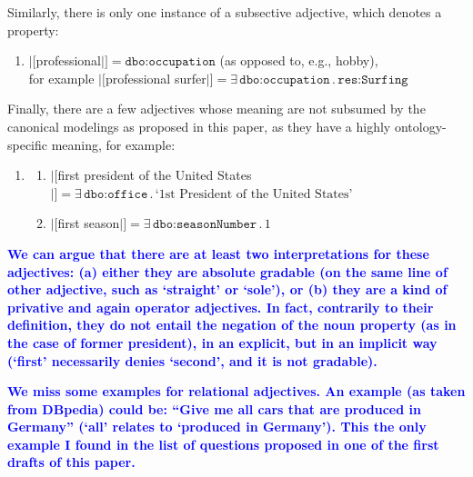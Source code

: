 \documentclass[11pt]{article}
\begin{document}
{Similarly, there is only one instance of a subsective adjective, which denotes a property:
\begin{enumerate}[resume]
\item $|[$professional$|]=\texttt{dbo:occupation}$ (as opposed to, e.g., hobby),\\
       for example $|[$professional surfer$|]=\exists\,\texttt{dbo:occupation}\,.\,\texttt{res:Surfing}$
\end{enumerate}

Finally, there are a few adjectives whose meaning are not subsumed by the canonical modelings as proposed in this paper, 
as they have a highly ontology-specific meaning, for example:
\begin{enumerate}[resume]
\item \begin{enumerate}
\item $|[$first president of the United States$|]=\exists\,\texttt{dbo:office}\,.\,\text{`1st President of the United States'}$
\item $|[$first season$|]=\exists\,\texttt{dbo:seasonNumber}\,.\,1$
\end{enumerate}
\end{enumerate}

\textbf{\textcolor{blue}{We can argue that there are at least two interpretations for these adjectives: (a) either they are absolute gradable (on the same line of other adjective, such as `straight' or `sole'), or (b) they are a kind of privative and again operator adjectives. In fact, contrarily to their definition, they do not entail the negation of the noun property (as in the case of former president), in an explicit, but in an implicit way (`first' necessarily denies `second', and it is not gradable).}}

\textbf{\textcolor{blue}{We miss some examples for relational adjectives. An example (as taken from DBpedia) could be: ``Give me all cars that are produced in Germany'' (`all' relates to `produced in Germany'). This the only example I found in the list of questions proposed in one of the first drafts of this paper.}}





}
\end{document}
